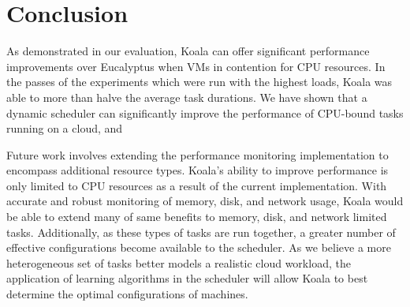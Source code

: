 \section{Conclusion}
\label{sec:conclusion}

As demonstrated in our evaluation, Koala can offer significant performance improvements over Eucalyptus when VMs in contention for CPU resources.  In the passes of the experiments which were run with the highest loads, Koala was able to more than halve the average task durations.    We have shown that a dynamic scheduler can significantly improve the performance of CPU-bound tasks running on a cloud, and 

Future work involves extending the performance monitoring implementation to encompass additional resource types.  Koala's ability to improve performance is only limited to CPU resources as a result of the current implementation.  With accurate and robust monitoring of memory, disk, and network usage, Koala would be able to extend many of same benefits to memory, disk, and network limited tasks.  Additionally, as these types of tasks are run together, a greater number of effective configurations become available to the scheduler.  As we believe a more heterogeneous set of tasks better models a realistic cloud workload, the application of learning algorithms in the scheduler will allow Koala to best determine the optimal configurations of machines.

